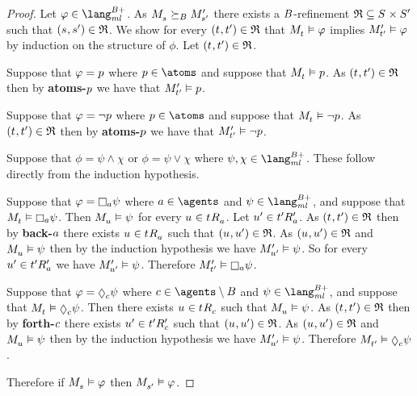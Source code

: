 \begin{proof}
Let $\phi \in \langMlPlusBs$.
As $\kPModel{\kStateS} \simulatesBs \kPModelP{\kStateSP}$ there exists a $B$-refinement $\refinement \subseteq \kStates \times \kStatesP$ such that $(\kStateS, \kStateSP) \in \refinement$.
We show for every $(\kStateT, \kStateTP) \in \refinement$ that $\kPModel{\kStateT} \entails \phi$ implies ${M^{\prime}_{{t}^{\prime}}} \vDash \varphi$ by induction on the structure of $\phi$.
Let $(\kStateT, \kStateTP) \in \refinement$.

Suppose that $\varphi = p$ where $\atomP \in \atoms$ and suppose that $\kPModel{\kStateT} \entails \atomP$.
As $(\kStateT, \kStateTP) \in \refinement$ then by {\bf atoms-$p$} we have that ${M^{\prime}_{{t}^{\prime}}} \vDash p$.

Suppose that $\varphi = \lnot p$ where $\atomP \in \atoms$ and suppose that $\kPModel{\kStateT} \entails \lnot \atomP$.
As $(\kStateT, \kStateTP) \in \refinement$ then by {\bf atoms-$p$} we have that ${M^{\prime}_{{t}^{\prime}}} \vDash \lnot p$.

Suppose that $\phi = \psi \land \chi$ or $\phi = \psi \lor \chi$ where $\psi, \chi \in \langMlPlusBs$.
These follow directly from the induction hypothesis.

Suppose that $\phi = \necessaryA \psi$ where $\agentA \in \agents$ and $\psi \in \langMlPlusBs$, and suppose that $\kPModel{\kStateT} \entails \necessaryA \psi$.
Then $\kPModel{\kStateU} \entails \psi$ for every $\kStateU \in \kSuccessorsA{\kStateT}$.
Let ${u}^{\prime} \in {{t}^{\prime}} {R^{\prime}_{a}}$.
As $(\kStateT, \kStateTP) \in \refinement$ then by {\bf back-$a$} there exists $\kStateU \in \kSuccessorsA{\kStateT}$ such that $(\kStateU, \kStateUP) \in \refinement$.
As $(\kStateU, \kStateUP) \in \refinement$ and $\kPModel{\kStateU} \entails \psi$ then by the induction hypothesis we have ${M^{\prime}_{{u}^{\prime}}} \vDash \psi$.
So for every ${u}^{\prime} \in {{t}^{\prime}} {R^{\prime}_{a}}$ we have ${M^{\prime}_{{u}^{\prime}}} \vDash \psi$.
Therefore $\kPModelP{\kStateTP} \entails \necessaryA \psi$.

Suppose that $\phi = \possibleC \psi$ where $\agentC \in \agents \setminus \agentsB$ and $\psi \in \langMlPlusBs$, and suppose that $\kPModel{\kStateT} \entails \possibleC \psi$.
Then there exists $\kStateU \in \kSuccessorsC{\kStateT}$ such that $\kPModel{\kStateU} \entails \psi$.
As $(\kStateT, \kStateTP) \in \refinement$ then by {\bf forth-$c$} there exists ${u}^{\prime} \in {{t}^{\prime}} {R^{\prime}_{c}}$ such that $(\kStateU, \kStateUP) \in \refinement$.
As $(\kStateU, \kStateUP) \in \refinement$ and $\kPModel{\kStateU} \entails \psi$ then by the induction hypothesis we have ${M^{\prime}_{{u}^{\prime}}} \vDash \psi$.
Therefore $\kPModel{\kStateTP} \entails \possibleC \psi$.

Therefore if $\kPModel{\kStateS} \entails \phi$ then $\kPModel{\kStateSP} \entails \phi$.
\end{proof}

